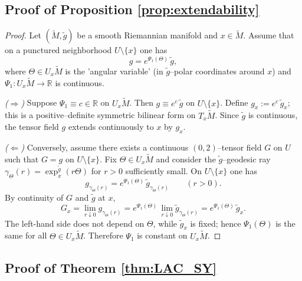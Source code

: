 \documentclass{amsart}
\theoremstyle{definition}
\theoremstyle{remark}
\newcommand{\cl}{\mathbb{R}}
\newcommand{\0}{\boldsymbol{0}}
\begin{document}
\subsection{Proof of Proposition \ref{prop:extendability}}

\begin{proof}
Let $(\widetilde M,\widetilde g)$ be a smooth Riemannian manifold and $x\in\widetilde M$. 
Assume that on a punctured neighborhood $U\setminus\{x\}$ one has
\[
g=e^{\Psi_1(\Theta)}\,\widetilde g,
\]
where $\Theta\in U_x\widetilde M$ is the 'angular variable' (in $\widetilde g$–polar coordinates around $x$) and $\Psi_1:U_x\widetilde M\to \cl$ is continuous.

\smallskip
\noindent\emph{($\Rightarrow$)} Suppose $\Psi_1\equiv c\in \cl $ on $U_x\widetilde M$. Then $g\equiv e^c\,\widetilde g$ on $U\setminus\{x\}$. 
Define $g_x:=e^c\,\widetilde g_x$; this is a positive–definite symmetric bilinear form on $T_x\widetilde M$. 
Since $\widetilde g$ is continuous, the tensor field $g$ extends continuously to $x$ by $g_x$.

\smallskip
\noindent\emph{($\Leftarrow$)} Conversely, assume there exists a continuous $(0,2)$–tensor field $G$ on $U$ such that
$G=g$ on $U\setminus\{x\}$. Fix $\Theta\in U_x\widetilde M$ and consider the $\widetilde g$–geodesic ray
$\gamma_\Theta(r)=\exp_x^{\tilde g}(r\Theta)$ for $r>0$ sufficiently small. On $U\setminus\{x\}$ one has
\[
g_{\gamma_\Theta(r)}=e^{\Psi_1(\Theta)}\,\widetilde g_{\gamma_\Theta(r)}\qquad (r>0).
\]
By continuity of $G$ and $\widetilde g$ at $x$,
\[
G_x=\lim_{r\downarrow 0} g_{\gamma_\Theta(r)}
     =e^{\Psi_1(\Theta)}\,\lim_{r\downarrow 0}\widetilde g_{\gamma_\Theta(r)}
     =e^{\Psi_1(\Theta)}\,\widetilde g_x .
\]
The left-hand side does not depend on $\Theta$, while $\widetilde g_x$ is fixed; hence $\Psi_1(\Theta)$ is the same for all $\Theta\in U_x\widetilde M$. Therefore $\Psi_1$ is constant on $U_x\widetilde M$.

\smallskip

\end{proof}

\subsection{Proof of Theorem \ref{thm:LAC_SY}}
\end{document}

